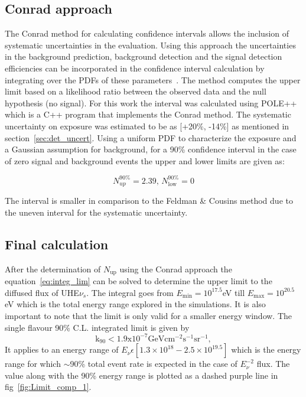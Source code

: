 \subsection{Conrad approach}
\label{subsec:Conrad}
The Conrad method for calculating confidence intervals allows the inclusion of systematic uncertainties in the evaluation. Using this approach the uncertainties in the background prediction, background detection and the signal detection efficiencies can be incorporated in the confidence interval calculation by integrating over the PDFs of these parameters~\cite{Conrad:2002kn}. The method computes the upper limit based on a likelihood ratio between the observed data and the null hypothesis (no signal). For this work the interval was calculated using POLE++~\cite{Conrad:2005zm} which is a C++ program that implements the Conrad method. The systematic uncertainty on exposure was estimated to be as [+20\%, -14\%] as mentioned in section~\ref{sec:det_uncert}. Using a uniform PDF to characterize the exposure and a Gaussian assumption for background, for a 90\% confidence interval in the case of zero signal and background events the upper and lower limits are given as: 

\begin{equation}
  \label{eq:Conrad_lim}
  N^{90\%}_{up} = 2.39, \,N^{90\%}_{\text{low}} = 0
\end{equation}

The interval is smaller in comparison to the Feldman \& Cousins method due to the uneven interval for the systematic uncertainty. 

\subsection{Final calculation}
\label{subsec:final_lim}
After the determination of $N_{\text{up}}$ using the Conrad approach the equation~\ref{eq:integ_lim} can be solved to determine the upper limit to the diffused flux of UHE$\nu_s$. The integral goes from $E_{\text{min}} = 10^{17.5} $eV till $E_{\text{max}} = 10^{20.5} $eV which is the total energy range explored in the simulations. It is also important to note that the limit is only valid for a smaller energy window. The single flavour 90\% C.L. integrated limit is given by 
\begin{equation}
  \label{eq:final_lim} 
  \mathrm{k_{90} < 1.9 x 10^{-7} GeV cm^{-2} s^{-1} sr^{-1}},
\end{equation}
It applies to an energy range of $E_{\nu} \epsilon [1.3 \times 10^{18} - 2.5 \times 10^{19.5}]$ which is the energy range for which $\sim$90\% total event rate is expected in the case of $E^{-2}_{\nu}$ flux. The value along with the 90\% energy range is plotted as a dashed purple line in fig~\ref{fig:Limit_comp_1}.

